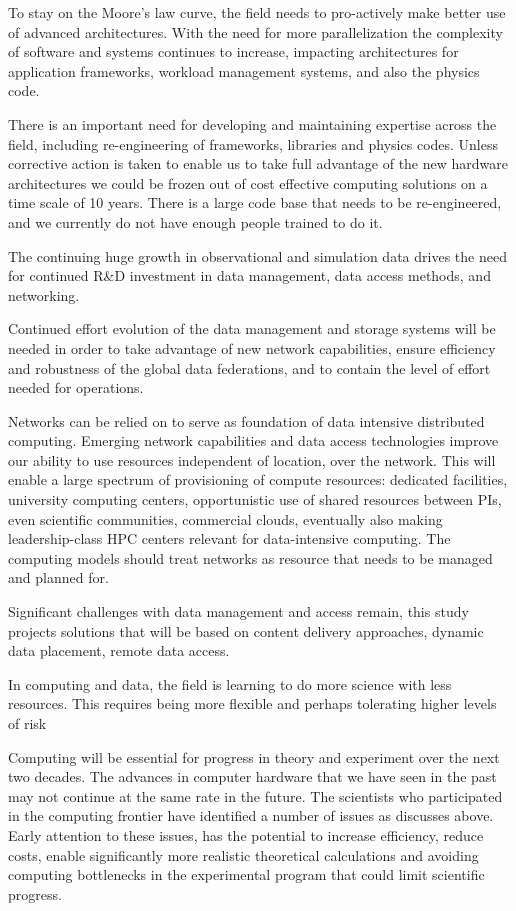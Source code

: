 To stay on the Moore’s law curve, the field needs to pro-actively make better use of advanced architectures. With the need for more parallelization the complexity of software and systems continues to increase, impacting architectures for application frameworks, workload management systems, and also the physics code. 

There is an important need for developing and maintaining expertise across the field, including re-engineering of frameworks, libraries and physics codes. Unless corrective action is taken to enable us to take full advantage of the new hardware architectures we could be frozen out of cost effective computing solutions on a time scale of 10 years. There is a large code base that needs to be re-engineered, and we currently do not have enough people trained to do it.

The continuing huge growth in observational and simulation data drives the need for continued R&D investment in data management, data access methods, and networking. 

Continued effort evolution of the data management and storage systems will be needed in order to take advantage of new network capabilities, ensure efficiency and robustness of the global data federations, and to contain the level of effort needed for operations. 

Networks can be relied on to serve as foundation of data intensive distributed computing. Emerging network capabilities and data access technologies improve our ability to use resources independent of location, over the network. This will enable a large spectrum of provisioning of compute resources: dedicated facilities, university computing centers, opportunistic use of shared resources between PIs, even scientific communities, commercial clouds, eventually also making leadership-class HPC centers relevant for data-intensive computing. The computing models should treat networks as resource that needs to be managed and planned for. 

Significant challenges with data management and access remain, this study projects solutions that will be based on content delivery approaches, dynamic data placement, remote data access. 

In computing and data, the field is learning to do more science with less resources. This requires being more flexible and perhaps tolerating higher levels of risk

Computing will be essential for progress in theory and experiment over the next two decades.  The advances in computer hardware that we have seen in the past may not continue at the same rate in the future.  The scientists who participated in the computing frontier have identified a number of issues as discusses above. Early attention to these issues, has the potential to increase efficiency, reduce costs, enable significantly more realistic theoretical calculations and avoiding computing bottlenecks in the experimental program that could limit scientific progress.
